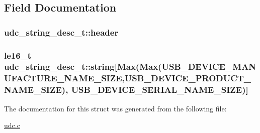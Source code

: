 \subsection{\-Field \-Documentation}
\hypertarget{structudc__string__desc__t_a2e3d32221a0a7ffb3edc623b2fab91e2}{
\subsubsection[{header}]{ {\bf udc\-\_\-string\-\_\-desc\-\_\-t\-::header}}}
\label{structudc__string__desc__t_a2e3d32221a0a7ffb3edc623b2fab91e2}
\hypertarget{structudc__string__desc__t_afa37487318dd377251b7a7fe19f21837}{
\subsubsection[{string}]{\setlength{\rightskip}{0pt plus 5cm}le16\-\_\-t {\bf udc\-\_\-string\-\_\-desc\-\_\-t\-::string}\mbox{[}\-Max(\-Max(\-U\-S\-B\-\_\-\-D\-E\-V\-I\-C\-E\-\_\-\-M\-A\-N\-U\-F\-A\-C\-T\-U\-R\-E\-\_\-\-N\-A\-M\-E\-\_\-\-S\-I\-Z\-E,\-U\-S\-B\-\_\-\-D\-E\-V\-I\-C\-E\-\_\-\-P\-R\-O\-D\-U\-C\-T\-\_\-\-N\-A\-M\-E\-\_\-\-S\-I\-Z\-E), \-U\-S\-B\-\_\-\-D\-E\-V\-I\-C\-E\-\_\-\-S\-E\-R\-I\-A\-L\-\_\-\-N\-A\-M\-E\-\_\-\-S\-I\-Z\-E)\mbox{]}}}
\label{structudc__string__desc__t_afa37487318dd377251b7a7fe19f21837}


\-The documentation for this struct was generated from the following file\-:\begin{DoxyCompactItemize}
\item 
\hyperlink{udc_8c}{udc.\-c}\end{DoxyCompactItemize}
